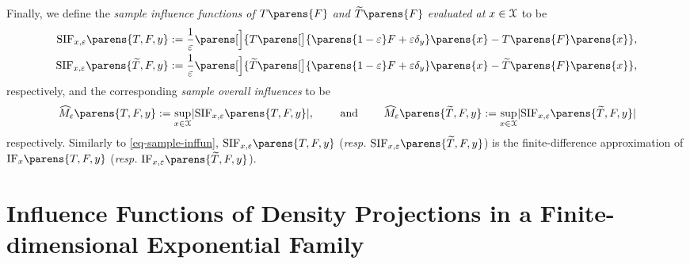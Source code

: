Finally, we define the \textit{sample influence functions of $T \parens{F}$ and $\widetilde{T} \parens{F}$ evaluated at $x \in \mathcal{X}$} to be 
\begin{align*}
	\mathrm{SIF}_{x, \varepsilon} \parens{T, F, y} := \frac{1}{\varepsilon} \parens[\Big]{T \parens[\big]{\parens{1 - \varepsilon} F + \varepsilon \delta_y} \parens{x} - T \parens{F} \parens{x}}, \\ 
	\mathrm{SIF}_{x, \varepsilon} \parens{\widetilde{T}, F, y} := \frac{1}{\varepsilon} \parens[\Big]{\widetilde{T} \parens[\big]{\parens{1 - \varepsilon} F + \varepsilon \delta_y} \parens{x} - \widetilde{T} \parens{F} \parens{x}}, 
\end{align*}
respectively, and the corresponding \textit{sample overall influences} to be 
\begin{align*}
	\widehat{M}_{\varepsilon} \parens{T, F, y} := \sup_{x \in \calX} \abs{\mathrm{SIF}_{x, \varepsilon} \parens{T, F, y}}, \qquad \text{ and } \qquad
	\widehat{M}_{\varepsilon} \parens{\widetilde{T}, F, y} := \sup_{x \in \calX} \abs{\mathrm{SIF}_{x, \varepsilon} \parens{\widetilde{T}, F, y}}
\end{align*}
respectively. Similarly to \eqref{eq-sample-inffun}, $\mathrm{SIF}_{x, \varepsilon} \parens{T, F, y}$ (\textit{resp.} $\mathrm{SIF}_{x, \varepsilon} \parens{\widetilde{T}, F, y}$) is the finite-difference approximation of $\mathrm{IF}_{x} \parens{T, F, y}$ (\textit{resp.} $\mathrm{IF}_{x, \varepsilon} \parens{\widetilde{T}, F, y}$). 


%
%
%


\section{Influence Functions of Density Projections in a Finite-dimensional Exponential Family}\label{section-influence-function-fin-dim-exp-fam}

